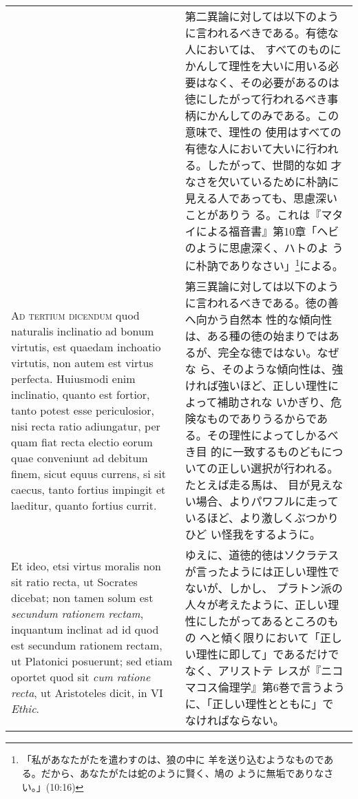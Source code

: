 \documentclass[10pt]{jsarticle}
\begin{document}
\begin{longtable}{p{21em}p{21em}}
&

第二異論に対しては以下のように言われるべきである。有徳な人においては、
すべてのものにかんして理性を大いに用いる必要はなく、その必要があるのは
徳にしたがって行われるべき事柄にかんしてのみである。この意味で、理性の
使用はすべての有徳な人において大いに行われる。したがって、世間的な如
才なさを欠いているために朴訥に見える人であっても、思慮深いことがありう
る。これは『マタイによる福音書』第10章「ヘビのように思慮深く、ハトのよ
うに朴訥でありなさい」\footnote{「私があなたがたを遣わすのは、狼の中に
羊を送り込むようなものである。だから、あなたがたは蛇のように賢く、鳩の
ように無垢でありなさい。」(10:16)}による。

\\



{\scshape Ad tertium dicendum} quod naturalis inclinatio ad bonum
virtutis, est quaedam inchoatio virtutis, non autem est virtus
perfecta. Huiusmodi enim inclinatio, quanto est fortior, tanto potest
esse periculosior, nisi recta ratio adiungatur, per quam fiat recta
electio eorum quae conveniunt ad debitum finem, sicut equus currens,
si sit caecus, tanto fortius impingit et laeditur, quanto fortius
currit. 

&

第三異論に対しては以下のように言われるべきである。徳の善へ向かう自然本
性的な傾向性は、ある種の徳の始まりではあるが、完全な徳ではない。なぜな
ら、そのような傾向性は、強ければ強いほど、正しい理性によって補助されな
いかぎり、危険なものでありうるからである。その理性によってしかるべき目
的に一致するものどもについての正しい選択が行われる。たとえば走る馬は、
目が見えない場合、よりパワフルに走っているほど、より激しくぶつかりひど
い怪我をするように。

\\



Et ideo, etsi virtus moralis non sit ratio recta, ut Socrates dicebat;
non tamen solum est {\itshape secundum rationem rectam}, inquantum
inclinat ad id quod est secundum rationem rectam, ut Platonici
posuerunt; sed etiam oportet quod sit {\itshape cum ratione recta}, ut
Aristoteles dicit, in VI {\itshape Ethic}.

&

ゆえに、道徳的徳はソクラテスが言ったようには正しい理性でないが、しかし、
プラトン派の人々が考えたように、正しい理性にしたがってあるところのもの
へと傾く限りにおいて「正しい理性に即して」であるだけでなく、アリストテ
レスが『ニコマコス倫理学』第6巻で言うように、「正しい理性とともに」で
なければならない。


\end{longtable}
\newpage
\end{document}
